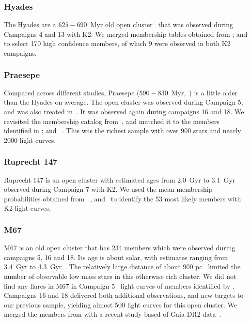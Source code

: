 \documentclass{aa}
\begin{document}
\subsubsection{Hyades}
The Hyades are a $625-690$~Myr old open cluster~\citep{perryman1998,salaris_age_2004, gossage2018, gaia_dr2_2018_hrd} that was observed during Campaigns 4 and 13 with K2.  We merged membership tables obtained from \citet{douglas_praesepe_hyades_2014, reino_hyades_2018}; and \citet{gaia_dr2_2018_hrd} to select 170 high confidence members, of which 9 were observed in both K2 campaigns. 
\subsubsection{Praesepe}
Compared across different studies, Praesepe ($590-830$~Myr,~\citealt{salaris_age_2004, boudreault_astrometric_2012, scholz2015, yen2018, gossage2018, bossini2019}) is a little older than the Hyades on average. The open cluster was observed during Campaign 5, and was also treated in~. It was observed again during campaigns 16 and 18. We revisited the membership catalog from~\citet{douglas_praesepe_hyades_2014}, and matched it to the members identified in \citet{douglas_poking_2017, rebull_praesepe_2017,cantat_gaudin_2018}; and ~\citet{gaia_dr2_2018_hrd}. This was the richest sample with over 900 stars and nearly 2000 light curves.
\subsubsection{Ruprecht 147}
Ruprecht 147 is an open cluster with estimated ages from 2.0~Gyr to 3.1~Gyr~\citep{curtis2013,scholz2015,gaia_dr2_2018_hrd,torres2018} observed during Campaign 7 with K2. We used the mean membership probabilities obtained from ~\citet{curtis2013, cantat_gaudin_2018, olivares_ngc6774_2019}, and~\citet{gaia_dr2_2018_hrd} to identify the 53 most likely members with K2 light curves.
\subsubsection{M67}
M67 is an old open cluster that has 234 members which were observed during campaigns 5, 16 and 18. Its age is about solar, with estimates ranging from 3.4~Gyr to 4.3~Gyr~\citep{salaris_age_2004, onehag2011, dias_fitting_2012, scholz2015, barnes_rotation_2016, bossini2019}. The relatively large distance of about 900 pc~\citep{dias_fitting_2012} limited the number of observable low mass stars in this otherwise rich cluster. We did not find any flares in M67 in Campaign 5~ light curves of members identified by \citet{gonzalez_m67mem_2016}. Campaigns 16 and 18 delivered both additional observations, and new targets to our previous sample, yielding almost 500 light curves for this open cluster. We merged the members from \citet{gonzalez_m67mem_2016} with a recent study based of Gaia DR2 data~\citep{gao_m67mem_2018}.
\end{document}
